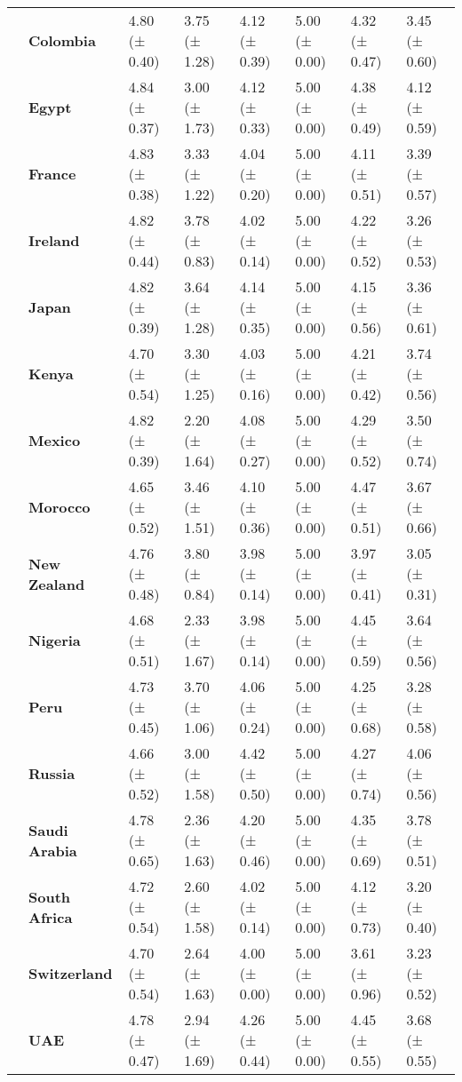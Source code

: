 \begin{tabular}{llllllll}
\textbf{} & \textbf{Colombia} & 4.80 (± 0.40) & 3.75 (± 1.28) & 4.12 (± 0.39) & 5.00 (± 0.00) & 4.32 (± 0.47) & 3.45 (± 0.60) \\
\textbf{} & \textbf{Egypt} & 4.84 (± 0.37) & 3.00 (± 1.73) & 4.12 (± 0.33) & 5.00 (± 0.00) & 4.38 (± 0.49) & 4.12 (± 0.59) \\
\textbf{} & \textbf{France} & 4.83 (± 0.38) & 3.33 (± 1.22) & 4.04 (± 0.20) & 5.00 (± 0.00) & 4.11 (± 0.51) & 3.39 (± 0.57) \\
\textbf{} & \textbf{Ireland} & 4.82 (± 0.44) & 3.78 (± 0.83) & 4.02 (± 0.14) & 5.00 (± 0.00) & 4.22 (± 0.52) & 3.26 (± 0.53) \\
\textbf{} & \textbf{Japan} & 4.82 (± 0.39) & 3.64 (± 1.28) & 4.14 (± 0.35) & 5.00 (± 0.00) & 4.15 (± 0.56) & 3.36 (± 0.61) \\
\textbf{} & \textbf{Kenya} & 4.70 (± 0.54) & 3.30 (± 1.25) & 4.03 (± 0.16) & 5.00 (± 0.00) & 4.21 (± 0.42) & 3.74 (± 0.56) \\
\textbf{} & \textbf{Mexico} & 4.82 (± 0.39) & 2.20 (± 1.64) & 4.08 (± 0.27) & 5.00 (± 0.00) & 4.29 (± 0.52) & 3.50 (± 0.74) \\
\textbf{} & \textbf{Morocco} & 4.65 (± 0.52) & 3.46 (± 1.51) & 4.10 (± 0.36) & 5.00 (± 0.00) & 4.47 (± 0.51) & 3.67 (± 0.66) \\
\textbf{} & \textbf{New Zealand} & 4.76 (± 0.48) & 3.80 (± 0.84) & 3.98 (± 0.14) & 5.00 (± 0.00) & 3.97 (± 0.41) & 3.05 (± 0.31) \\
\textbf{} & \textbf{Nigeria} & 4.68 (± 0.51) & 2.33 (± 1.67) & 3.98 (± 0.14) & 5.00 (± 0.00) & 4.45 (± 0.59) & 3.64 (± 0.56) \\
\textbf{} & \textbf{Peru} & 4.73 (± 0.45) & 3.70 (± 1.06) & 4.06 (± 0.24) & 5.00 (± 0.00) & 4.25 (± 0.68) & 3.28 (± 0.58) \\
\textbf{} & \textbf{Russia} & 4.66 (± 0.52) & 3.00 (± 1.58) & 4.42 (± 0.50) & 5.00 (± 0.00) & 4.27 (± 0.74) & 4.06 (± 0.56) \\
\textbf{} & \textbf{Saudi Arabia} & 4.78 (± 0.65) & 2.36 (± 1.63) & 4.20 (± 0.46) & 5.00 (± 0.00) & 4.35 (± 0.69) & 3.78 (± 0.51) \\
\textbf{} & \textbf{South Africa} & 4.72 (± 0.54) & 2.60 (± 1.58) & 4.02 (± 0.14) & 5.00 (± 0.00) & 4.12 (± 0.73) & 3.20 (± 0.40) \\
\textbf{} & \textbf{Switzerland} & 4.70 (± 0.54) & 2.64 (± 1.63) & 4.00 (± 0.00) & 5.00 (± 0.00) & 3.61 (± 0.96) & 3.23 (± 0.52) \\
\textbf{} & \textbf{UAE} & 4.78 (± 0.47) & 2.94 (± 1.69) & 4.26 (± 0.44) & 5.00 (± 0.00) & 4.45 (± 0.55) & 3.68 (± 0.55) \\

\end{tabular}

